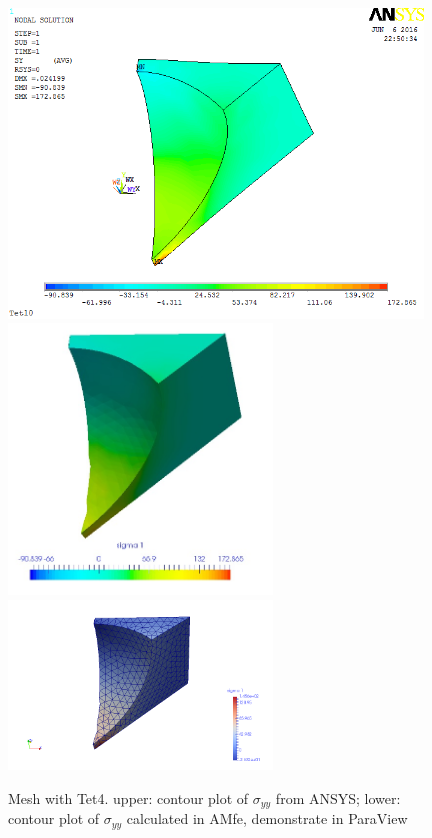 \begin{figure}[htbp]
	\begin{center}
		\includegraphics[width=11cm,clip]{Tet4Syy.png} 
		\includegraphics[width=7cm,clip]{Tet4SyyPD.png} 			
		\includegraphics[width=7cm,clip]{Tet4SyyP.png} 		
		\caption{Mesh with Tet4. upper: contour plot of $\sigma_{yy}$ from ANSYS; lower: contour plot of $\sigma_{yy}$ calculated in AMfe, demonstrate in ParaView} \label{fig: Tet4Syy}
	\end{center}
\end{figure}
\clearpage 

